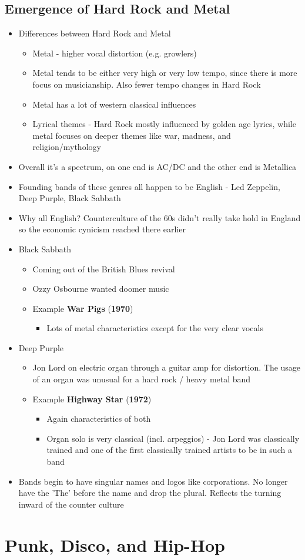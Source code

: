 \documentclass[11pt]{report}
\newcommand{\imp}[1]{\textbf{#1}}
\newcommand{\idate}[2]{\textcolor{blue!50}{\imp{#1}}\label{date:#2}}
\newcommand{\bl}{\begin{itemize}}
\newcommand{\kl}{\end{itemize}}
\newcommand{\song}[2]{\textcolor{red!70}{\textbf{#1}} (\idate{#2}{#1})}
\begin{document}
\section{Emergence of Hard Rock and Metal}
\begin{itemize}
	\item Differences between Hard Rock and Metal
	\bl
		\item Metal - higher vocal distortion (e.g. growlers)
		\item Metal tends to be either very high or very low tempo, since there is more focus on musicianship. Also fewer tempo changes in Hard Rock
		\item Metal has a lot of western classical influences
		\item Lyrical themes - Hard Rock mostly influenced by golden age lyrics, while metal focuses on deeper themes like war, madness, and religion/mythology
	\kl
	\item Overall it's a spectrum, on one end is AC/DC and the other end is Metallica
	\item Founding bands of these genres all happen to be English - Led Zeppelin, Deep Purple, Black Sabbath
	\item Why all English? Counterculture of the 60s didn't really take hold in England so the economic cynicism reached there earlier
	\item Black Sabbath
	\bl
		\item Coming out of the British Blues revival
		\item Ozzy Osbourne wanted doomer music
		\item Example \song{War Pigs}{1970}
		\bl
			\item Lots of metal characteristics except for the very clear vocals
		\kl
	\kl
	\item Deep Purple
	\bl
		\item Jon Lord on electric organ through a guitar amp for distortion. The usage of an organ was unusual for a hard rock / heavy metal band
		\item Example \song{Highway Star}{1972}
		\bl
			\item Again characteristics of both
			\item Organ solo is very classical (incl. arpeggios) - Jon Lord was classically trained and one of the first classically trained artists to be in such a band
		\kl
	\kl
	\item Bands begin to have singular names and logos like corporations. No longer have the 'The' before the name and drop the plural. Reflects the turning inward of the counter culture


\end{itemize}

\chapter{Punk, Disco, and Hip-Hop}
\end{document}

